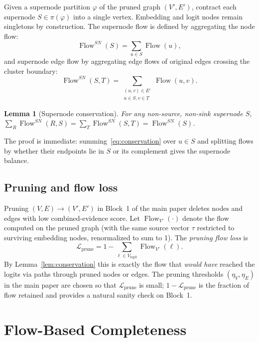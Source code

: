 \documentclass[11pt]{article}
\DeclareMathOperator{\Flow}{Flow}
\newtheorem{lemma}{Lemma}
\begin{document}
Given a supernode partition $\varphi$ of the pruned graph
$(V', E')$, contract each supernode $S \in \pi(\varphi)$ into a
single vertex. Embedding and logit nodes remain singletons by
construction. The supernode flow is defined by aggregating the
node flow:
\begin{equation}
\Flow^{SN}(S) = \sum_{u \in S} \Flow(u),
\label{eq:flow-sn-node}
\end{equation}
and supernode edge flow by aggregating edge flows of original edges
crossing the cluster boundary:
\begin{equation}
\Flow^{SN}(S, T) = \sum_{\substack{(u, v) \in E' \\ u \in S, v \in T}} \Flow(u, v).
\label{eq:flow-sn-edge}
\end{equation}

\begin{lemma}[Supernode conservation]\label{lem:sn-conservation}
For any non-source, non-sink supernode $S$,
$\sum_{R} \Flow^{SN}(R, S) = \sum_{T} \Flow^{SN}(S, T) = \Flow^{SN}(S)$.
\end{lemma}

The proof is immediate: summing~\eqref{eq:conservation} over
$u \in S$ and splitting flows by whether their endpoints lie in
$S$ or its complement gives the supernode balance.

\subsection{Pruning and flow loss}

Pruning $(V, E) \to (V', E')$ in Block~1 of the main paper deletes
nodes and edges with low combined-evidence score. Let
$\Flow_{V'}(\cdot)$ denote the flow computed on the pruned graph
(with the same source vector $\tau$ restricted to surviving
embedding nodes, renormalized to sum to 1). The
\emph{pruning flow loss} is
\begin{equation}
\mathcal{L}_{\text{prune}} = 1 - \sum_{\ell \in V_{\text{logit}}}
\Flow_{V'}(\ell).
\label{eq:prune-loss}
\end{equation}
By Lemma~\ref{lem:conservation} this is exactly the flow that
\emph{would have} reached the logits via paths through pruned nodes
or edges. The pruning thresholds $(\eta_V, \eta_E)$ in the main
paper are chosen so that $\mathcal{L}_{\text{prune}}$ is small;
$1 - \mathcal{L}_{\text{prune}}$ is the fraction of flow retained
and provides a natural sanity check on Block~1.

\section{Flow-Based Completeness}\label{sec:completeness}
\end{document}

